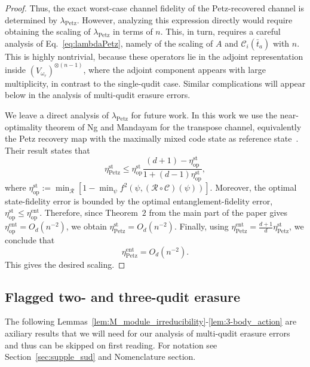 \documentclass[10pt,twocolumn,superscriptaddress,aps,amsmath,amssymb,citeautoscript,floatfix,prx]{revtex4-2}
\theoremstyle{plain}
\theoremstyle{plain}
\theoremstyle{plain}
\theoremstyle{plain}
\theoremstyle{plain}
\theoremstyle{plain}
\theoremstyle{plain}
\theoremstyle{definition}
\theoremstyle{plain}
\begin{document}
\begin{appendix}
\begin{proof}
Thus, the exact worst-case channel fidelity of the Petz-recovered channel is determined by \(\lambda_{\mathrm{Petz}}\). 
However, analyzing this expression directly would require obtaining the scaling of \(\lambda_{\mathrm{Petz}}\) in terms of \(n\). 
This, in turn, requires a careful analysis of Eq.~\eqref{eq:lambdaPetz}, namely of the scaling of \(A\) and \(\mathcal C_i(\bar t_a)\) with \(n\). 
This is highly nontrivial, because these operators lie in the adjoint representation inside \((V_{\omega_r})^{\otimes(n-1)}\), 
where the adjoint component appears with large multiplicity, in contrast to the single-qudit case. 
Similar complications will appear below in the analysis of multi-qudit erasure errors.

We leave a direct analysis of \(\lambda_{\mathrm{Petz}}\) for future work. In this work we use the near-optimality theorem of Ng and Mandayam for the transpose channel, 
equivalently the Petz recovery map with the maximally mixed code state as reference state~\cite{Ng2010}. Their result states that
\[
\eta_{\mathrm{Petz}}^{\mathrm{st}}
\le
\eta_{\mathrm{op}}^{\mathrm{st}}
\frac{(d+1)-\eta_{\mathrm{op}}^{\mathrm{st}}}
{1+(d-1)\eta_{\mathrm{op}}^{\mathrm{st}}},
\]
where \(\eta_{\mathrm{op}}^{\mathrm{st}}:=\min_{\mathcal R}[1-\min_{\psi}f^2(\psi,(\mathcal R\circ\mathcal C)(\psi))]\). 
Moreover, the optimal state-fidelity error is bounded by the optimal entanglement-fidelity error, \(\eta_{\mathrm{op}}^{\mathrm{st}}\leq \eta_{\mathrm{op}}^{\mathrm{ent}}\). 
Therefore, since Theorem~$2$ from the main part of the paper gives \(\eta_{\mathrm{op}}^{\mathrm{ent}}=O_{d}(n^{-2})\), we obtain \(\eta_{\mathrm{Petz}}^{\mathrm{st}}=O_{d}(n^{-2})\). 
Finally, using \(\eta_{\mathrm{Petz}}^{\mathrm{ent}}=\frac{d+1}{d}\eta_{\mathrm{Petz}}^{\mathrm{st}}\), we conclude that
\[
\eta_{\mathrm{Petz}}^{\mathrm{ent}}=O_{d}(n^{-2}).
\]
This gives the desired scaling.

\end{proof}

\subsection{Flagged two- and three-qudit erasure}\label{subsec:supple_multi_erasure_noise}

The following Lemmas~\ref{lem:M_module_irreducibility}-\ref{lem:3-body_action} are axiliary results that we will need for our analysis of multi-qudit 
erasure errors and thus can be skipped on first reading.
For notation see Section~\ref{sec:supple_sud} and Nomenclature section.


\end{appendix}
\end{document}
